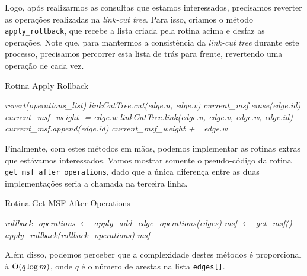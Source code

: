 Logo, após realizarmos as consultas que estamos interessados, precisamos reverter as operações realizadas na \emph{link-cut tree}. Para isso, criamos o método \texttt{apply\_rollback}, que recebe a lista criada pela rotina acima e desfaz as operações. Note que, para mantermos a consistência da \emph{link-cut tree} durante este processo, precisamos percorrer esta lista de trás para frente, revertendo uma operação de cada vez.

\begin{algorithm}[h!]
    \caption{Rotina Apply Rollback}\label{imsf-apply-rollback}
    \begin{algorithmic}[1]
        \State \emph{revert(operations\_list)}
        \State \emph{linkCutTree.cut(edge.u, edge.v)}
        \State \emph{current\_msf.erase(edge.id)}
        \State \emph{current\_msf\_weight -= edge.w}
        \Else
        \State \emph{linkCutTree.link(edge.u, edge.v, edge.w, edge.id)}
        \State \emph{current\_msf.append(edge.id)}
        \State \emph{current\_msf\_weight += edge.w}
        \EndIf
        \EndFor
        \EndFunction
    \end{algorithmic}
\end{algorithm}

Finalmente, com estes métodos em mãos, podemos implementar as rotinas extras que estávamos interessados. Vamos mostrar somente o pseudo-código da rotina \texttt{get\_msf\_after\_operations}, dado que a única diferença entre as duas implementações seria a chamada na terceira linha.

\begin{algorithm}[h!]
    \caption{Rotina Get MSF After Operations}\label{imsf-msf-after}
    \begin{algorithmic}[1]
        \State \emph{rollback\_operations $\gets$ apply\_add\_edge\_operations(edges)}
        \State \emph{msf $\gets$ get\_msf()}
        \State \emph{apply\_rollback(rollback\_operations)}
        \State \Return \emph{msf}
        \EndFunction
    \end{algorithmic}
\end{algorithm}

Além disso, podemos perceber que a complexidade destes métodos é proporcional à $\mathrm{O}(q \log m)$, onde $q$ é o número de arestas na lista \texttt{edges[]}.

